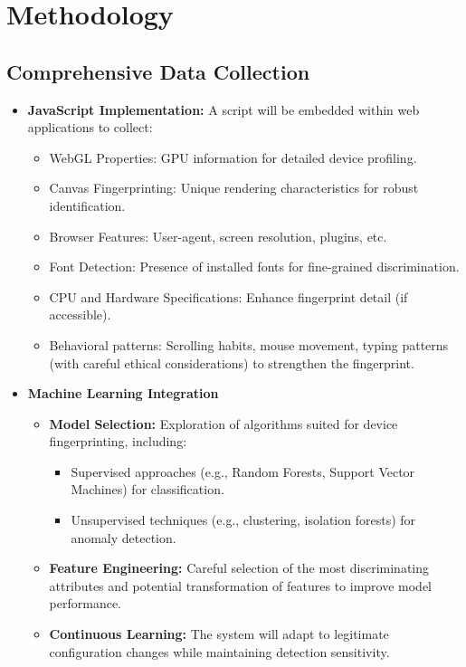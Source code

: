 \documentclass{article}
\begin{document}
\section{Methodology}

\subsection{Comprehensive Data Collection}
\begin{itemize}
    \item \textbf{JavaScript Implementation:} A script will be embedded within web applications to collect:
    \begin{itemize}
        \item WebGL Properties: GPU information for detailed device profiling.
        \item Canvas Fingerprinting: Unique rendering characteristics for robust identification.
        \item Browser Features: User-agent, screen resolution, plugins, etc.
        \item Font Detection: Presence of installed fonts for fine-grained discrimination.
        \item CPU and Hardware Specifications: Enhance fingerprint detail (if accessible).
        \item Behavioral patterns: Scrolling habits, mouse movement, typing patterns (with careful ethical considerations) to strengthen the fingerprint.
    \end{itemize}
    \item \textbf{Machine Learning Integration}
    \begin{itemize}
        \item \textbf{Model Selection:} Exploration of algorithms suited for device fingerprinting, including:
        \begin{itemize}
            \item Supervised approaches (e.g., Random Forests, Support Vector Machines) for classification.
            \item Unsupervised techniques (e.g., clustering, isolation forests) for anomaly detection.
        \end{itemize}
        \item \textbf{Feature Engineering:} Careful selection of the most discriminating attributes and potential transformation of features to improve model performance.
        \item \textbf{Continuous Learning:} The system will adapt to legitimate configuration changes while maintaining detection sensitivity.
    \end{itemize}
\end{itemize}
\end{document}
